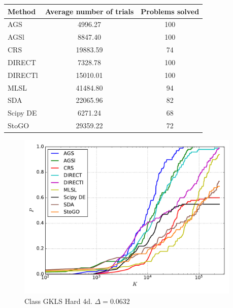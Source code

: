 \documentclass[a4paper]{article}
\begin{document}
\begin{tabular}{lcc}
\hline
 Method   &  Average number of trials  &  Problems solved  \\
\hline
 AGS      &          4996.27           &        100        \\
 AGSl     &          8847.40           &        100        \\
 CRS      &          19883.59          &        74         \\
 DIRECT   &          7328.78           &        100        \\
 DIRECTl  &          15010.01          &        100        \\
 MLSL     &          41484.80          &        94         \\
 SDA      &          22065.96          &        82         \\
 Scipy DE &          6271.24           &        68         \\
 StoGO    &          29359.22          &        72         \\
\hline
\end{tabular}
\begin{figure}[H]
  \center
  \includegraphics[width=0.95\textwidth]{../experiments/gklsh4d_serg/cmc.pdf}
  \caption{Class GKLS Hard 4d. $\Delta=0.0632$}

\end{figure}
\end{document}
